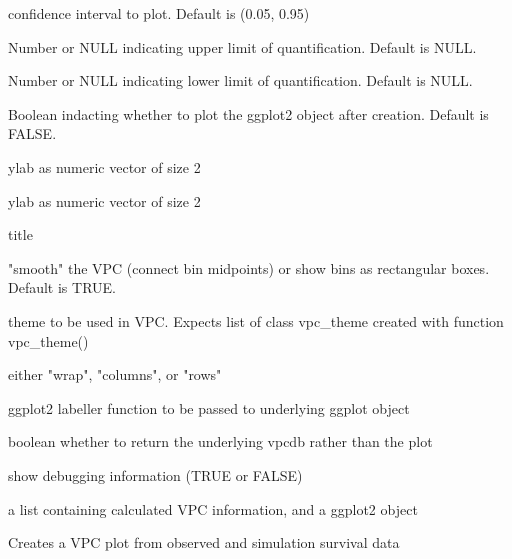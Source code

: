 \documentclass[letterpaper]{book}
\begin{document}
\begin{Arguments}
\begin{ldescription}
\item[\code{ci}] confidence interval to plot. Default is (0.05, 0.95)

\item[\code{uloq}] Number or NULL indicating upper limit of quantification. Default is NULL.

\item[\code{lloq}] Number or NULL indicating lower limit of quantification. Default is NULL.

\item[\code{plot}] Boolean indacting whether to plot the ggplot2 object after creation. Default is FALSE.

\item[\code{xlab}] ylab as numeric vector of size 2

\item[\code{ylab}] ylab as numeric vector of size 2

\item[\code{title}] title

\item[\code{smooth}] "smooth" the VPC (connect bin midpoints) or show bins as rectangular boxes. Default is TRUE.

\item[\code{vpc\_theme}] theme to be used in VPC. Expects list of class vpc\_theme created with function vpc\_theme()

\item[\code{facet}] either "wrap", "columns", or "rows"

\item[\code{labeller}] ggplot2 labeller function to be passed to underlying ggplot object

\item[\code{vpcdb}] boolean whether to return the underlying vpcdb rather than the plot

\item[\code{verbose}] show debugging information (TRUE or FALSE)
\end{ldescription}
\end{Arguments}
%
\begin{Value}
a list containing calculated VPC information, and a ggplot2 object
\end{Value}
%
\begin{SeeAlso}\relax
{}
\end{SeeAlso}
%
\begin{Description}\relax
Creates a VPC plot from observed and simulation survival data
\end{Description}
\end{document}
